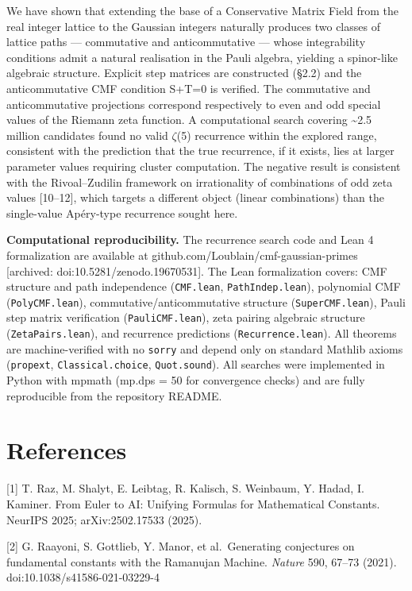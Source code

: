 \documentclass[11pt]{article}
\begin{document}
We have shown that extending the base of a Conservative Matrix Field
from the real integer lattice to the Gaussian integers naturally
produces two classes of lattice paths --- commutative and
anticommutative --- whose integrability conditions admit a natural
realisation in the Pauli algebra, yielding a spinor-like algebraic
structure. Explicit step matrices are constructed (§2.2) and the
anticommutative CMF condition S+T=0 is verified. The commutative and
anticommutative projections correspond respectively to even and odd
special values of the Riemann zeta function. A computational search
covering \textasciitilde2.5 million candidates found no valid
\(\zeta\)(5) recurrence within the explored range, consistent with the
prediction that the true recurrence, if it exists, lies at larger
parameter values requiring cluster computation. The negative result is
consistent with the Rivoal--Zudilin framework on irrationality of
combinations of odd zeta values {[}10--12{]}, which targets a different
object (linear combinations) than the single-value Apéry-type recurrence
sought here.

\textbf{Computational reproducibility.} The recurrence search code and
Lean 4 formalization are available at
github.com/Loublain/cmf-gaussian-primes {[}archived:
doi:10.5281/zenodo.19670531{]}. The Lean formalization covers: CMF
structure and path independence (\texttt{CMF.lean},
\texttt{PathIndep.lean}), polynomial CMF (\texttt{PolyCMF.lean}),
commutative/anticommutative structure (\texttt{SuperCMF.lean}), Pauli
step matrix verification (\texttt{PauliCMF.lean}), zeta pairing
algebraic structure (\texttt{ZetaPairs.lean}), and recurrence
predictions (\texttt{Recurrence.lean}). All theorems are
machine-verified with no \texttt{sorry} and depend only on standard
Mathlib axioms (\texttt{propext}, \texttt{Classical.choice},
\texttt{Quot.sound}). All searches were implemented in Python with
mpmath (mp.dps = 50 for convergence checks) and are fully reproducible
from the repository README.

\hypertarget{references}{%
\section{References}\label{references}}

{[}1{]} T. Raz, M. Shalyt, E. Leibtag, R. Kalisch, S. Weinbaum, Y.
Hadad, I. Kaminer. From Euler to AI: Unifying Formulas for Mathematical
Constants. NeurIPS 2025; arXiv:2502.17533 (2025).

{[}2{]} G. Raayoni, S. Gottlieb, Y. Manor, et al.~Generating conjectures
on fundamental constants with the Ramanujan Machine. \emph{Nature} 590,
67--73 (2021). doi:10.1038/s41586-021-03229-4
\end{document}
